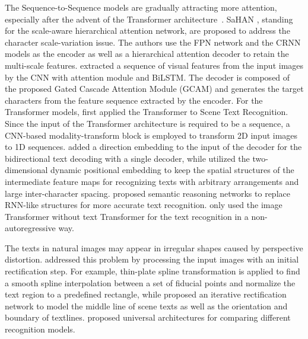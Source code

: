 \documentclass[letterpaper]{article} \usepackage{aaai23}  \usepackage{times}  \usepackage{helvet}  \usepackage{courier}  \usepackage[hyphens]{url}  \usepackage{graphicx} \urlstyle{rm} \def\UrlFont{\rm}  \usepackage{natbib}  \usepackage{caption} \frenchspacing  \setlength{\pdfpagewidth}{8.5in} \setlength{\pdfpageheight}{11in} \usepackage{algorithm}
\begin{document}
The Sequence-to-Sequence models \cite{zhang2020sahan, wang2019scene, sheng2019nrtr, bleeker2019bidirectional, lee2020recognizing, atienza2021vision} are gradually attracting more attention, especially after the advent of the Transformer architecture~\cite{vaswani2017attention}. 
SaHAN \cite{zhang2020sahan}, standing for the scale-aware hierarchical attention network, are proposed to address the character scale-variation issue. The authors use the FPN network and the CRNN models as the encoder as well as a hierarchical attention decoder to retain the multi-scale features. 
\cite{wang2019scene} extracted a sequence of visual features from the input images by the CNN with attention module and BiLSTM. The decoder is composed of the proposed Gated Cascade Attention Module (GCAM) and generates the target characters from the feature sequence extracted by the encoder.
For the Transformer models, \cite{sheng2019nrtr} first applied the Transformer to Scene Text Recognition. Since the input of the Transformer architecture is required to be a sequence, a CNN-based modality-transform block is employed to transform 2D input images to 1D sequences.
\cite{bleeker2019bidirectional} added a direction embedding to the input of the decoder for the bidirectional text decoding with a single decoder, while \cite{lee2020recognizing} utilized the two-dimensional dynamic positional embedding to keep the spatial structures of the intermediate feature maps for recognizing texts with arbitrary arrangements and large inter-character spacing. \cite{9156632} proposed semantic reasoning networks to replace RNN-like structures for more accurate text recognition.
\cite{atienza2021vision} only used the image Transformer without text Transformer for the text recognition in a non-autoregressive way.

The texts in natural images may appear in irregular shapes caused by perspective distortion. \cite{shi2016robust, baek2019wrong, litman2020scatter, shi2018aster, zhan2019esir} addressed this problem by processing the input images with an initial rectification step. For example, thin-plate spline transformation \cite{shi2016robust, baek2019wrong, litman2020scatter, shi2018aster} is applied to find a smooth spline interpolation between a set of fiducial points and normalize the text region to a predefined rectangle, while \cite{zhan2019esir} proposed an iterative rectification network to model the middle line of scene texts as well as the orientation and boundary of textlines. \cite{baek2019wrong, diaz2021rethinking} proposed universal architectures for comparing different recognition models. 
\end{document}

